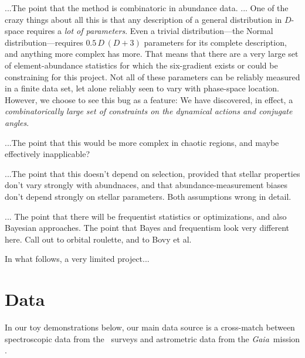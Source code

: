 \documentclass[modern]{aastex63}
\newcommand{\gaia}{\textsl{Gaia}}
\newcommand{\apogee}{\acronym{APOGEE}}
\begin{document}
...The point that the method is combinatoric in abundance data.
...
One of the crazy things about all this is that any description of a general distribution in $D$-space
requires a \emph{lot of parameters}.
Even a trivial distribution---the Normal distribution---requires $0.5\,D\,(D+3)$ parameters for its
complete description, and anything more complex has more.
That means that there are a very large set of element-abundance statistics for which the
six-gradient exists or could be constraining for this project.
Not all of these parameters can be reliably measured in a finite data set,
let alone reliably seen to vary with phase-space location.
However, we choose to see this bug as a feature:
We have discovered, in effect, a \emph{combinatorically large set of constraints on the
dynamical actions and conjugate angles}.

...The point that this would be more complex in chaotic regions, and
maybe effectively inapplicable?

...The point that this doesn't depend on selection, provided that
stellar properties don't vary strongly with abundnaces, and that
abundance-measurement biases don't depend strongly on stellar
parameters. Both assumptions wrong in detail.

... The point that there will be frequentist statistics or
optimizations, and also Bayesian approaches.  The point that Bayes and
frequentism look very different here. Call out to orbital roulette,
and to Bovy et al.

In what follows, a very limited project...

\section{Data}

In our toy demonstrations below, our main data source is a cross-match between
spectroscopic data from the \apogee\ surveys \citep{Majewski:2017} and
astrometric data from the \gaia\ mission \citep{Gaia-Collaboration:2016,
Gaia-Collaboration:2018}.
\end{document}
